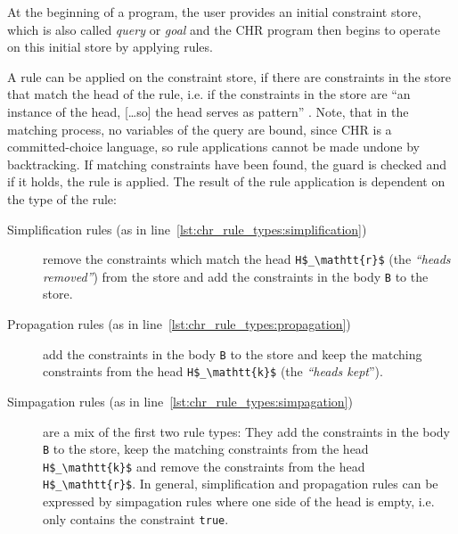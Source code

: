 At the beginning of a program, the user provides an initial constraint store, which is also called \emph{query} or \emph{goal} and the CHR program then begins to operate on this initial store by applying rules.

A rule can be applied on the constraint store, if there are constraints in the store that match the head of the rule, i.e. if the constraints in the store are ``an instance of the head, [\dots so] the head serves as pattern'' \cite[11]{fru_chr_book_2009}. Note, that in the matching process, no variables of the query are bound, since CHR is a committed-choice language, so rule applications cannot be made undone by backtracking. If matching constraints have been found, the guard is checked and if it holds, the rule is applied. The result of the rule application is dependent on the type of the rule:

\begin{description}
 \item[Simplification rules (as in line~\ref{lst:chr_rule_types:simplification})] remove the constraints which match the head \lstinline[mathescape]|H$_\mathtt{r}$| (the \emph{``heads removed''}) from the store and add the constraints in the body \lstinline|B| to the store.
 \item[Propagation rules (as in line~\ref{lst:chr_rule_types:propagation})] add the constraints in the body \lstinline|B| to the store and keep the matching constraints from the head \lstinline[mathescape]|H$_\mathtt{k}$| (the \emph{``heads kept}'').
 \item[Simpagation rules (as in line~\ref{lst:chr_rule_types:simpagation})] are a mix of the first two rule types: They add the constraints in the body \lstinline|B| to the store, keep the matching constraints from the head \lstinline[mathescape]|H$_\mathtt{k}$| and remove the constraints from the head \lstinline[mathescape]|H$_\mathtt{r}$|. In general, simplification and propagation rules can be expressed by simpagation rules where one side of the head is empty, i.e. only contains the constraint \lstinline|true|.
\end{description}

